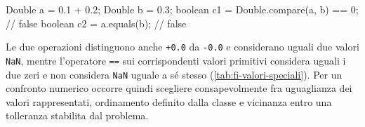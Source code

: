 \begin{unipdcode}[language=Java]
Double a = 0.1 + 0.2;
Double b = 0.3;
boolean c1 = Double.compare(a, b) == 0; // false
boolean c2 = a.equals(b);               // false
\end{unipdcode}

Le due operazioni distinguono anche \texttt{+0.0}
da \texttt{-0.0} e considerano uguali due valori
\texttt{NaN}, mentre l'operatore \texttt{==}
sui corrispondenti valori primitivi considera uguali
i due zeri e non considera \texttt{NaN} uguale a sé
stesso (\cref{tab:fi-valori-speciali}). Per un confronto
numerico occorre quindi scegliere consapevolmente fra
uguaglianza dei valori rappresentati, ordinamento
definito dalla classe e vicinanza entro una tolleranza
stabilita dal problema.
